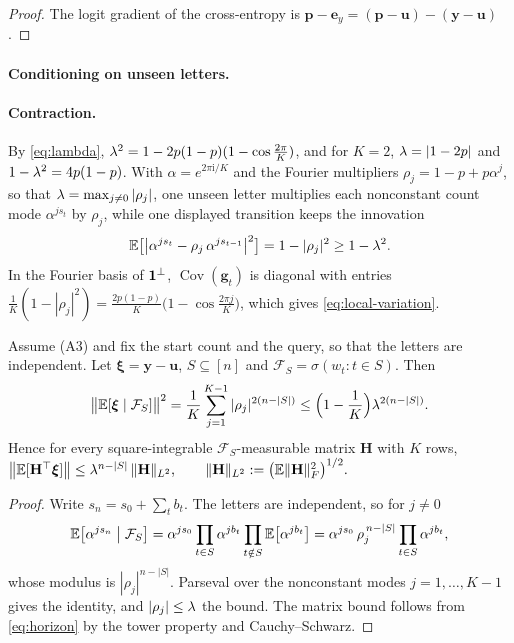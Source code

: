 \begin{proof}
The logit gradient of the cross-entropy is $\bm p-\bm e_y=(\bm p-\bm u)-(\bm y-\bm u)$.
\end{proof}

\paragraph{Conditioning on unseen letters.}
\label{app:target-spectrum}

\paragraph{Contraction.}\label{app:contraction} By \cref{eq:lambda}, $\mixrate^2=1-2p(1-p)(1-\cos\tfrac{2\pi}{K})$, and for $K=2$,
$\lambda=|1-2p|$ and $1-\lambda^2=4p(1-p)$. With $\alpha=e^{2\pi\mathrm i/K}$ and the Fourier multipliers
$\rho_j=1-p+p\alpha^j$, so that $\lambda=\max_{j\ne0}|\rho_j|$, one unseen letter multiplies each nonconstant count
mode $\alpha^{js_t}$ by $\rho_j$, while one displayed transition keeps the innovation
\begin{equation}
 \mathbb E\bigl[\bigl|\alpha^{j s_t}-\rho_j\,\alpha^{j s_{t-1}}\bigr|^2\bigr]=1-|\rho_j|^2\ge1-\lambda^2 .
 \label{eq:move-variance}
\end{equation}
In the Fourier basis of $\mathbf 1^\perp$, $\operatorname{Cov}(\bm g_t)$ is diagonal with entries $\tfrac{1}{K}(1-|\rho_j|^2)=\tfrac{2p(1-p)}{K}\bigl(1-\cos\tfrac{2\pi j}{K}\bigr)$,
which gives \cref{eq:local-variation}.

\begin{lemma}
\label{lem:target-contraction}
Assume (A3) and fix the start count and the query, so that the letters are independent. Let $\bm\xi=\bm y-\bm u$, $S\subseteq[n]$ and $\mathcal F_S=\sigma(w_t:t\in S)$. Then
\begin{equation}
 \bigl\|\mathbb E[\bm\xi\mid\mathcal F_S]\bigr\|^2=\frac{1}{K}\sum_{j=1}^{K-1}|\rho_j|^{2(n-|S|)}\le\Bigl(1-\frac{1}{K}\Bigr)\lambda^{2(n-|S|)} .
 \label{eq:horizon}
\end{equation}
Hence for every square-integrable $\mathcal F_S$-measurable matrix $\mathbf H$ with $K$ rows,
 $\bigl\|\mathbb E[\mathbf H^\top\bm\xi]\bigr\|\le\lambda^{n-|S|}\,\|\mathbf H\|_{L^2},\qquad \|\mathbf H\|_{L^2}:=\bigl(\mathbb E\|\mathbf H\|_F^2\bigr)^{1/2}.$ 
\end{lemma}

\begin{proof}
Write $s_n=s_0+\sum_tb_t$. The letters are independent, so for $j\ne0$
\[
 \mathbb E\bigl[\alpha^{js_n}\bigm|\mathcal F_S\bigr]=\alpha^{js_0}\prod_{t\in S}\alpha^{jb_t}\prod_{t\notin S}\mathbb E\bigl[\alpha^{jb_t}\bigr]=\alpha^{js_0}\,\rho_j^{\,n-|S|}\prod_{t\in S}\alpha^{jb_t},
\]
whose modulus is $|\rho_j|^{n-|S|}$. Parseval over the nonconstant modes $j=1,\ldots,K-1$ gives the identity, and $|\rho_j|\le\lambda$ the bound.
The matrix bound follows from \cref{eq:horizon} by the tower property
and Cauchy--Schwarz.
\end{proof}

